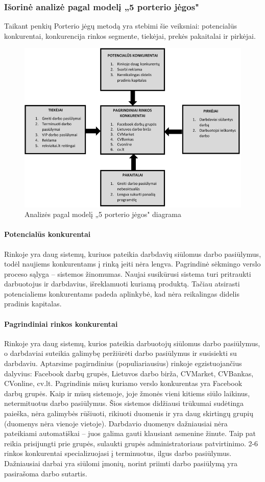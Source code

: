 \documentclass{VUMIFPSkursinis}
\begin{document}
\subsubsection{Išorinė analizė pagal modelį „5 porterio jėgos"}
Taikant penkių Porterio jėgų metodą yra stebimi šie veiksniai: potencialūs konkurentai, konkurencija rinkos segmente, tiekėjai, prekės pakaitalai ir pirkėjai.
\begin{figure}[H]
\centering
\includegraphics[width=\linewidth]{img/isorine1.png}
\caption{Analizės pagal modelį „5 porterio jėgos" diagrama}
\end{figure}
\paragraph{Potencialūs konkurentai}
Rinkoje yra daug sistemų, kuriuos pateikia darbdavių siūlomus darbo pasiūlymus, todėl naujiems konkurentams į rinką įeiti nėra lengva. Pagrindinė sėkmingo verslo proceso sąlyga – sistemos žinomumas.  Naujai susikūrusi sistema turi pritraukti darbuotojus ir darbdavius, išreklamuoti kuriamą produktą. Tačiau atsirasti potencialiems konkurentams padeda aplinkybė, kad nėra reikalingas didelis pradinis kapitalas.
\paragraph{Pagrindiniai rinkos konkurentai}
Rinkoje yra daug sistemų, kurios pateikia darbuotojų siūlomus darbo pasiūlymus, o darbdaviai suteikia galimybę peržiūrėti darbo pasiūlymus ir susisiekti su darbdaviu. Aptarsime pagirndinius (populiariausius) rinkoje egzistuojančius dalyvius: Facebook darbų grupės, Lietuvos darbo birža, CVMarket, CVBankas, CVonline, cv.lt. Pagrindinis mūsų kuriamo verslo konkurentas yra Facebook darbų grupės.  Kaip ir mūsų sistemoje, joje žmonės vieni kitiems siūlo laikinus, netermituotus darbo pasiūlymus. Šios sistemos didžiausi trūkumai sudėtinga paieška, nėra galimybės rūšiuoti, rikiuoti duomenis ir yra daug skirtingų grupių (duomenys nėra vienoje vietoje). Darbdavio duomenys dažniausiai nėra pateikiami automatiškai – juos galima gauti klausiant asmenine žinute. Taip pat reikia prisijungti prie grupės, sulaukti grupės administratoriaus patvirtinimo. 2-6 rinkos konkurentai specializuojasi į terminuotus, ilgus darbo pasiūlymus. Dažniausiai darbai yra siūlomi įmonių, norint priimti darbo pasiūlymą yra pasirašoma darbo sutartis.
\end{document}

